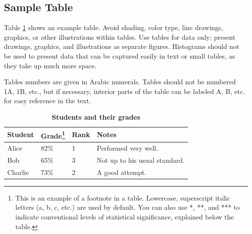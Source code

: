 \documentclass[9pt,twocolumn,twoside]{gsajnl_modified}
\begin{document}
\subsection{Sample Table}

Table \ref{tab:shape-functions} shows an example table. Avoid shading, color type, line drawings, graphics, or other illustrations within tables. Use tables for data only; present drawings, graphics, and illustrations as separate figures. Histograms should not be used to present data that can be captured easily in text or small tables, as they take up much more space.  

Tables numbers are given in Arabic numerals. Tables should not be numbered 1A, 1B, etc., but if necessary, interior parts of the table can be labeled A, B, etc. for easy reference in the text.  


\begin{table}[htbp]
\centering
\caption{\bf Students and their grades}
\begin{tableminipage}{\textwidth}
\begin{tabularx}{\textwidth}{XXXX}
\hline
Student & Grade\footnote{This is an example of a footnote in a table. Lowercase, superscript italic letters (a, b, c, etc.) are used by default. You can also use *, **, and *** to indicate conventional levels of statistical significance, explained below the table.} & Rank & Notes \\
\hline
Alice & 82\% & 1 & Performed very well.\\
Bob & 65\% & 3 & Not up to his usual standard.\\
Charlie & 73\% & 2 & A good attempt.\\
\hline
\end{tabularx}
  \label{tab:shape-functions}
\end{tableminipage}
\end{table}


\end{document}
